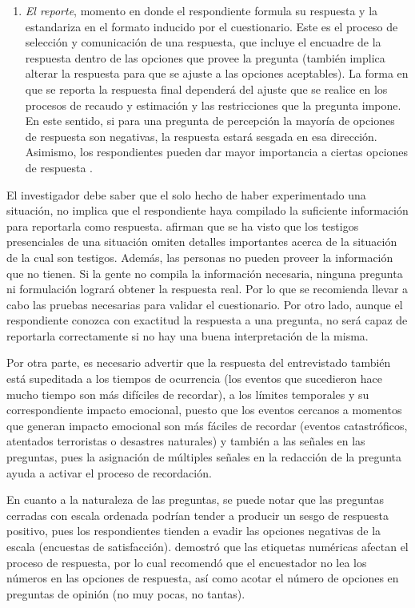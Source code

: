 \documentclass[
  12pt,
]{book}
\begin{document}
\begin{enumerate}
\item
  \emph{El reporte}, momento en donde el respondiente formula su respuesta y la estandariza en el formato inducido por el cuestionario. Este es el proceso de selección y comunicación de una respuesta, que incluye el encuadre de la respuesta dentro de las opciones que provee la pregunta (también implica alterar la respuesta para que se ajuste a las opciones aceptables). La forma en que se reporta la respuesta final dependerá del ajuste que se realice en los procesos de recaudo y estimación y las restricciones que la pregunta impone. En este sentido, si para una pregunta de percepción la mayoría de opciones de respuesta son negativas, la respuesta estará sesgada en esa dirección. Asimismo, los respondientes pueden dar mayor importancia a ciertas opciones de respuesta \citep{Groves_Fowler_Couper_Lepkowski_Singer_Tourangeau_2009}.
\end{enumerate}

El investigador debe saber que el solo hecho de haber experimentado una situación, no implica que el respondiente haya compilado la suficiente información para reportarla como respuesta. \citet{Groves_Fowler_Couper_Lepkowski_Singer_Tourangeau_2009} afirman que se ha visto que los testigos presenciales de una situación omiten detalles importantes acerca de la situación de la cual son testigos. Además, las personas no pueden proveer la información que no tienen. Si la gente no compila la información necesaria, ninguna pregunta ni formulación logrará obtener la respuesta real. Por lo que se recomienda llevar a cabo las pruebas necesarias para validar el cuestionario. Por otro lado, aunque el respondiente conozca con exactitud la respuesta a una pregunta, no será capaz de reportarla correctamente si no hay una buena interpretación de la misma.

Por otra parte, es necesario advertir que la respuesta del entrevistado también está supeditada a los tiempos de ocurrencia (los eventos que sucedieron hace mucho tiempo son más difíciles de recordar), a los límites temporales y su correspondiente impacto emocional, puesto que los eventos cercanos a momentos que generan impacto emocional son más fáciles de recordar (eventos catastróficos, atentados terroristas o desastres naturales) y también a las señales en las preguntas, pues la asignación de múltiples señales en la redacción de la pregunta ayuda a activar el proceso de recordación.

En cuanto a la naturaleza de las preguntas, se puede notar que las preguntas cerradas con escala ordenada podrían tender a producir un sesgo de respuesta positivo, pues los respondientes tienden a evadir las opciones negativas de la escala (encuestas de satisfacción). \citet{Schwarz1991} demostró que las etiquetas numéricas afectan el proceso de respuesta, por lo cual recomendó que el encuestador no lea los números en las opciones de respuesta, así como acotar el número de opciones en preguntas de opinión (no muy pocas, no tantas).
\end{document}
